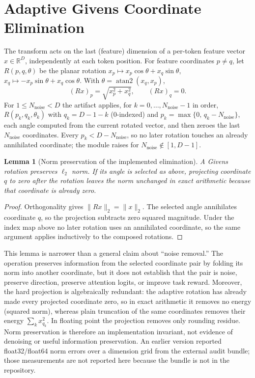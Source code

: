 \documentclass{article}
\newtheorem{lemma}{Lemma}
\begin{document}
\section{Adaptive Givens Coordinate Elimination}

The transform acts on the last (feature) dimension of a per-token feature
vector $x\in\mathbb{R}^D$, independently at each token position.  For feature
coordinates $p\ne q$, let $R(p,q,\theta)$ be the planar rotation
$x_p\mapsto x_p\cos\theta+x_q\sin\theta$,
$x_q\mapsto -x_p\sin\theta+x_q\cos\theta$.  With
$\theta=\operatorname{atan2}(x_q,x_p)$,
\begin{equation}
  (Rx)_p=\sqrt{x_p^2+x_q^2},
  \qquad
  (Rx)_q=0.
\end{equation}
For $1\leq N_{\mathrm{noise}}<D$ the artifact applies, for
$k=0,\ldots,N_{\mathrm{noise}}-1$ in order, $R(p_k,q_k,\theta_k)$ with
$q_k=D-1-k$ (0-indexed) and $p_k=\max\{0,\,q_k-N_{\mathrm{noise}}\}$, each
angle computed from the current rotated vector, and then zeroes the last
$N_{\mathrm{noise}}$ coordinates.  Every $p_k<D-N_{\mathrm{noise}}$, so no later
rotation touches an already annihilated coordinate; the module raises for
$N_{\mathrm{noise}}\notin[1,D-1]$.

\begin{lemma}[Norm preservation of the implemented elimination]
A Givens rotation preserves $\ell_2$ norm.  If its angle is selected as above,
projecting coordinate $q$ to zero after the rotation leaves the norm unchanged
in exact arithmetic because that coordinate is already zero.
\end{lemma}

\begin{proof}
Orthogonality gives $\|Rx\|_2=\|x\|_2$.  The selected angle annihilates
coordinate $q$, so the projection subtracts zero squared magnitude.  Under the
index map above no later rotation uses an annihilated coordinate, so the same
argument applies inductively to the composed rotations.
\end{proof}

This lemma is narrower than a general claim about ``noise removal.''  The
operation preserves information from the selected coordinate pair by folding
its norm into another coordinate, but it does not establish that the pair is
noise, preserve direction, preserve attention logits, or improve task reward.
Moreover, the hard projection is algebraically redundant: the adaptive
rotation has already made every projected coordinate zero, so in exact
arithmetic it removes no energy (squared norm), whereas plain truncation of
the same coordinates removes their energy $\sum_k x_{q_k}^2$.  In floating
point the projection removes only rounding residue.  Norm preservation is
therefore an implementation invariant, not evidence of denoising or useful
information preservation.  An earlier version reported float32/float64 norm
errors over a dimension grid from the external audit bundle; those
measurements are not reported here because the bundle is not in the
repository.
\end{document}
